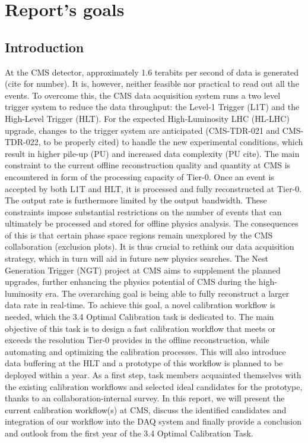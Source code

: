\chapter{Report's goals}

\section{Introduction}

At the CMS detector, approximately 1.6 terabits per second of data is generated (cite for number). It is, however, neither feasible nor practical to read out all the events. To overcome this, the CMS data acquisition system runs a two level trigger system to reduce the data throughput: the Level-1 Trigger (L1T) and the High-Level Trigger (HLT). For the expected High-Luminosity LHC (HL-LHC) upgrade, changes to the trigger system are anticipated (CMS-TDR-021 and CMS-TDR-022, to be properly cited) to handle the new experimental conditions, which result in higher pile-up (PU) and increased data complexity (PU cite). 
\newline \newline 
The main constraint to the current offline reconstruction quality and quantity at CMS is encountered in form of the processing capacity of Tier-0. Once an event is accepted by both L1T and HLT, it is processed and fully reconstructed at Tier-0. The output rate is furthermore limited by the output bandwidth. These constraints impose substantial restrictions on the number of events that can ultimately be processed and stored for offline physics analysis. The consequences of this is that certain phase space regions remain unexplored by the CMS collaboration (exclusion plots). It is thus crucial to rethink our data acquisition strategy, which in turn will aid in future new physics searches. The Nest Generation Trigger (NGT) project at CMS aims to supplement the planned upgrades, further enhancing the physics potential of CMS during the high-luminosity era. The overarching goal is being able to fully reconstruct a larger data rate in real-time.
\newline \newline
To achieve this goal, a novel calibration workflow is needed, which the 3.4 Optimal Calibration task is dedicated to. The main objective of this task is to design a fast calibration workflow that meets or exceeds the resolution Tier-0 provides in the offline reconstruction, while automating and optimizing the calibration processes. This will also introduce data buffering at the HLT and a prototype of this workflow is planned to be deployed within a year. As a first step, task members acquainted themselves with the existing calibration workflows and selected ideal candidates for the prototype, thanks to an collaboration-internal survey. In this report, we will present the current calibration workflow(s) at CMS, discuss the identified candidates and integration of our workflow into the DAQ system and finally provide a conclusion and outlook from the first year of the 3.4 Optimal Calibration Task.

